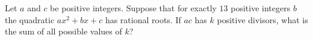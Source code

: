 Let $a$ and $c$ be positive integers. Suppose that for exactly $13$ positive integers $b$ the quadratic $ax^2+bx+c$ has rational roots. If $ac$ has $k$ positive divisors, what is the sum of all possible values of $k$?
